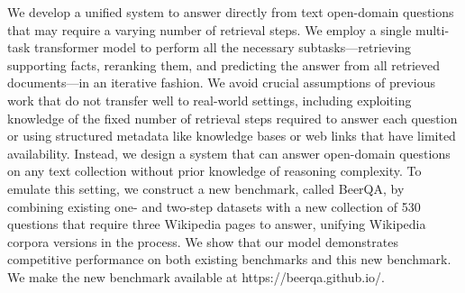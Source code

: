 We develop a unified system to answer directly from text open-domain questions that may require a varying number of retrieval steps. We employ a single multi-task transformer model to perform all the necessary subtasks---retrieving supporting facts, reranking them, and predicting the answer from all retrieved documents---in an iterative fashion. We avoid crucial assumptions of previous work that do not transfer well to real-world settings, including exploiting knowledge of the fixed number of retrieval steps required to answer each question or using structured metadata like knowledge bases or web links that have limited availability. Instead, we design a system that can answer open-domain questions  on any text collection without prior knowledge of reasoning complexity. To emulate this setting, we construct a new benchmark, called BeerQA, by combining existing one- and two-step datasets with a new collection of 530 questions that require three Wikipedia pages to answer, unifying Wikipedia corpora versions in the process. We show that our model demonstrates competitive performance on both existing benchmarks and this new benchmark. We make the new benchmark available at https://beerqa.github.io/.
